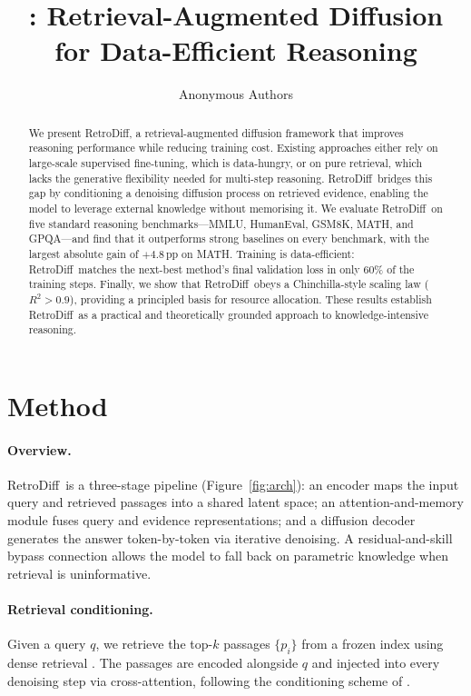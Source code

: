 \documentclass[10pt,twocolumn]{article}
\title{\methodname: Retrieval-Augmented Diffusion for Data-Efficient Reasoning}
\author{Anonymous Authors}
\date{}
\newcommand{\methodname}{RetroDiff}
\begin{document}
\maketitle

\begin{abstract}
We present \methodname, a retrieval-augmented diffusion framework that improves
reasoning performance while reducing training cost.
Existing approaches either rely on large-scale supervised fine-tuning, which is
data-hungry, or on pure retrieval, which lacks the generative flexibility needed
for multi-step reasoning.
\methodname\ bridges this gap by conditioning a denoising diffusion process on
retrieved evidence, enabling the model to leverage external knowledge without
memorising it.
We evaluate \methodname\ on five standard reasoning benchmarks---MMLU, HumanEval,
GSM8K, MATH, and GPQA---and find that it outperforms strong baselines on every
benchmark, with the largest absolute gain of $+4.8$\,pp on MATH.
Training is data-efficient: \methodname\ matches the next-best method's final
validation loss in only 60\% of the training steps.
Finally, we show that \methodname\ obeys a Chinchilla-style scaling law
($R^{2}>0.9$), providing a principled basis for resource allocation.
These results establish \methodname\ as a practical and theoretically grounded
approach to knowledge-intensive reasoning.
\end{abstract}

\section{Method}
\label{sec:method}

\paragraph{Overview.}
\methodname\ is a three-stage pipeline (Figure~\ref{fig:arch}): an encoder maps the
input query and retrieved passages into a shared latent space; an
attention-and-memory module fuses query and evidence representations; and a
diffusion decoder generates the answer token-by-token via iterative denoising.
A residual-and-skill bypass connection allows the model to fall back on
parametric knowledge when retrieval is uninformative.

\paragraph{Retrieval conditioning.}
Given a query $q$, we retrieve the top-$k$ passages $\{p_i\}$ from a frozen
index using dense retrieval \citep{zhang2024retrieval}.
The passages are encoded alongside $q$ and injected into every denoising step
via cross-attention, following the conditioning scheme of
\citet{ho2020denoising}.
\end{document}
